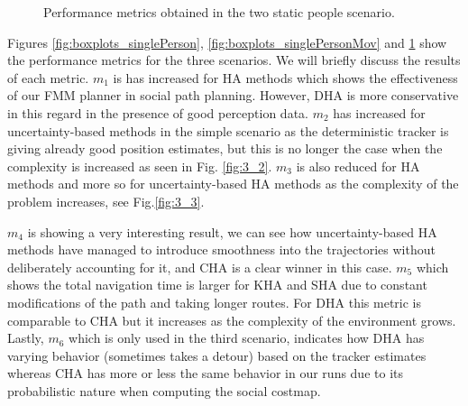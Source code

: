\begin{figure}[t!]
%
%

\caption{Performance metrics obtained in the two static people scenario.
}
\label{fig:boxplots_2people}
\end{figure}


Figures \ref{fig:boxplots_singlePerson}, \ref{fig:boxplots_singlePersonMov} and \ref{fig:boxplots_2people} show the performance metrics for the three scenarios. We will briefly discuss the results of each metric. $m_{1}$ is has increased for HA methods which shows the effectiveness of our FMM planner in social path planning. However, DHA is more conservative in this regard in the presence of good perception data. $m_{2}$ has increased for uncertainty-based methods in the simple scenario as the deterministic tracker is giving already good position estimates, but this is no longer the case when the complexity is increased as seen in Fig. \ref{fig:3_2}. $m_{3}$ is also reduced for HA methods and more so for uncertainty-based HA methods as the complexity of the problem increases, see Fig.\ref {fig:3_3}.


 $m_{4}$ is showing a very interesting result, we can see how uncertainty-based HA methods have managed to introduce smoothness into the trajectories without deliberately accounting for it, and CHA is a clear winner in this case. $m_{5}$ which shows the total navigation time is larger for KHA and SHA due to constant modifications of the path and taking longer routes. For DHA this metric is comparable to CHA but it increases as the complexity of the environment grows. Lastly, $m_{6}$ which is only used in the third scenario, indicates how DHA has varying behavior (sometimes takes a detour) based on the tracker estimates whereas CHA has more or less the same behavior in our runs due to its probabilistic nature when computing the social costmap.     



